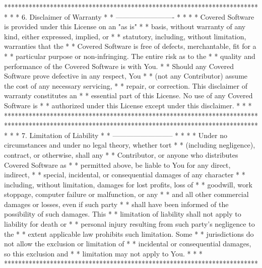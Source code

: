 \begin{DoxyVerb}
************************************************************************
*                                                                      *
* 6. Disclaimer of Warranty                                            *
* -------------------------                                            *
*                                                                      *
* Covered Software is provided under this License on an "as is"        *
* basis, without warranty of any kind, either expressed, implied, or   *
* statutory, including, without limitation, warranties that the        *
* Covered Software is free of defects, merchantable, fit for a         *
* particular purpose or non-infringing. The entire risk as to the      *
* quality and performance of the Covered Software is with You.         *
* Should any Covered Software prove defective in any respect, You      *
* (not any Contributor) assume the cost of any necessary servicing,    *
* repair, or correction. This disclaimer of warranty constitutes an    *
* essential part of this License. No use of any Covered Software is    *
* authorized under this License except under this disclaimer.          *
*                                                                      *
************************************************************************
************************************************************************
*                                                                      *
* 7. Limitation of Liability                                           *
* --------------------------                                           *
*                                                                      *
* Under no circumstances and under no legal theory, whether tort       *
* (including negligence), contract, or otherwise, shall any            *
* Contributor, or anyone who distributes Covered Software as           *
* permitted above, be liable to You for any direct, indirect,          *
* special, incidental, or consequential damages of any character       *
* including, without limitation, damages for lost profits, loss of     *
* goodwill, work stoppage, computer failure or malfunction, or any     *
* and all other commercial damages or losses, even if such party       *
* shall have been informed of the possibility of such damages. This    *
* limitation of liability shall not apply to liability for death or    *
* personal injury resulting from such party's negligence to the        *
* extent applicable law prohibits such limitation. Some                *
* jurisdictions do not allow the exclusion or limitation of            *
* incidental or consequential damages, so this exclusion and           *
* limitation may not apply to You.                                     *
*                                                                      *
************************************************************************


\end{DoxyVerb}
